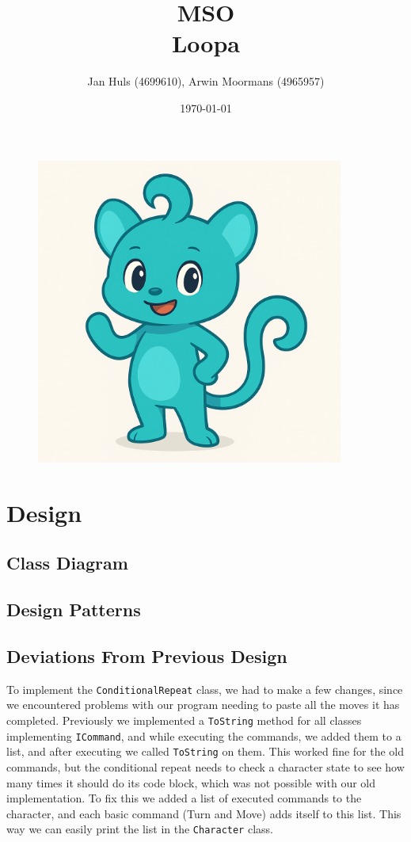 \documentclass[11pt,a4paper]{article}
\date{\monthyear\today}
\title{\textbf{MSO \\ Loopa}}
\author{Jan Huls (4699610), Arwin Moormans (4965957)}
\begin{document}
 
    \maketitle
    \begin{figure}[htbp]
        \centering
        \includegraphics[width=0.9\textwidth]{mascot}
        \label{image-mascot}
    \end{figure}
    \newpage
    \section*{Design}
    \subsection*{Class Diagram}
    \subsection*{Design Patterns}
    \subsection*{Deviations From Previous Design}
    To implement the \texttt{ConditionalRepeat} class, we had to make a few changes, since we encountered problems with our program needing to paste all the moves it has completed. 
    Previously we implemented a \texttt{ToString} method for all classes implementing \texttt{ICommand}, and while executing the commands, we added them to a list, and after executing we called \texttt{ToString} on them.
    This worked fine for the old commands, but the conditional repeat needs to check a character state to see how many times it should do its code block, which was not possible with our old implementation. 
    To fix this we added a list of executed commands to the character, and each basic command (Turn and Move) adds itself to this list.
    This way we can easily print the list in the \texttt{Character} class. 
    
    
\end{document}
